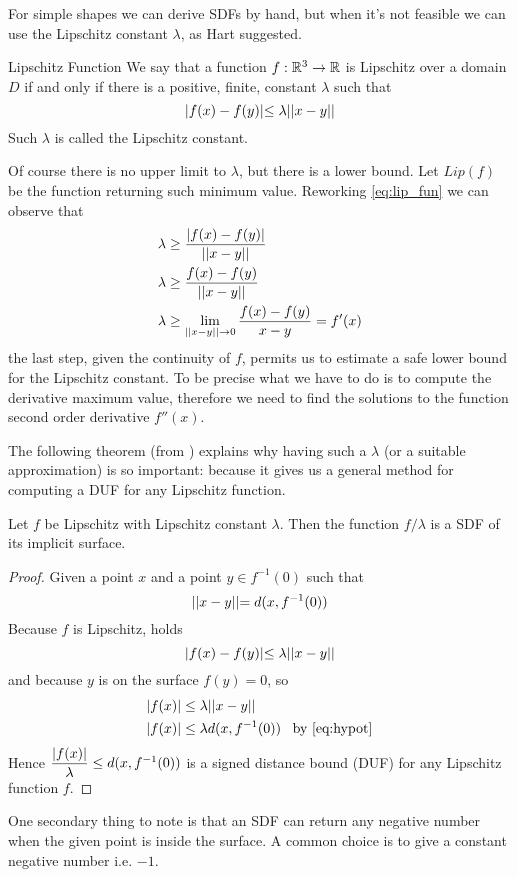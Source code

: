 For simple shapes we can derive SDFs by hand, but when it's not feasible we can use the Lipschitz constant $\lambda$, as Hart\cite{hart1996} suggested.

\begin{definition}{Lipschitz Function}
We say that a function $f : \mathbb{R}^3 \to \mathbb{R}$ is Lipschitz over a domain $D$ if and only if there is a positive, finite, constant $\lambda$ such that
\begin{equation}\label{eq:lip_fun}
\lvert f(x) - f(y) \lvert \leq \lambda \lvert\lvert x - y \lvert\lvert
\end{equation}
Such $\lambda$ is called the Lipschitz constant.
\end{definition}
\noindent
Of course there is no upper limit to $\lambda$, but there is a lower bound.
Let $Lip(f)$ be the function returning such minimum value.
Reworking \autoref{eq:lip_fun} we can observe that
\begin{align*}
  \lambda &\geq \dfrac{\lvert f(x) - f(y) \lvert}{\lvert\lvert x - y \lvert\lvert} \\
  \lambda &\geq \dfrac{f(x) - f(y)}{\lvert\lvert x - y \lvert\lvert}\\
  \lambda &\geq \lim_{\lvert\lvert x-y \lvert\lvert \to 0} \dfrac{f(x) - f(y)}{x - y} = f'(x)
\end{align*}
the last step, given the continuity of $f$, permits us to estimate a safe lower bound for the Lipschitz constant.
To be precise what we have to do is to compute the derivative maximum value, therefore we need to find the solutions to the function second order derivative $f''(x)$.

The following theorem (from \cite{hart1996}) explains why having such a $\lambda$ (or a suitable approximation) is so important: because it gives us a general method for computing a DUF for any Lipschitz function.
\begin{theorem}
  Let $f$ be Lipschitz with Lipschitz constant $\lambda$.
  Then the function $f / \lambda$ is a SDF of its implicit surface.
\end{theorem}
\begin{proof}
  Given a point $x$ and a point $y \in f^{-1}(0)$ such that
  \begin{equation}
  \label{eq:hypot}
    \lvert\lvert x - y \lvert\lvert = d(x, f^{-1}(0))
  \end{equation}
  Because $f$ is Lipschitz, holds
  $$ \lvert f(x) - f(y) \lvert \leq \lambda \lvert\lvert x - y \lvert\lvert $$
  and because $y$ is on the surface $f(y) = 0$, so
  \begin{align*}
    \abs{f(x)} &\leq \lambda \norm{x - y} \\
    \abs{f(x)} &\leq \lambda d(x, f^{-1}(0)) \;\;\; \text{by \autoref{eq:hypot}}
  \end{align*}
  Hence
  $ \dfrac{\lvert f(x) \lvert}{\lambda} \leq d(x, f^{-1}(0)) $
  is a signed distance bound (DUF) for any Lipschitz function $f$.
\end{proof}
One secondary thing to note is that an SDF can return any negative number when the given point is inside the surface.
A common choice is to give a constant negative number i.e. $-1$.

